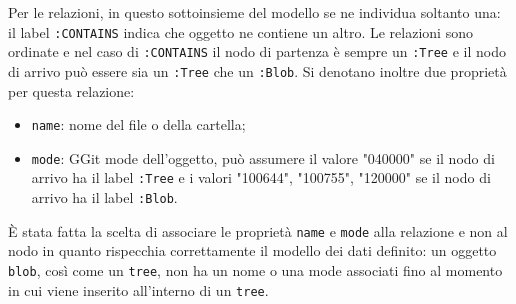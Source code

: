 Per le relazioni, in questo sottoinsieme del modello se ne individua soltanto una: il label \texttt{:CONTAINS} indica che oggetto ne contiene un altro. Le relazioni sono ordinate e nel caso di \texttt{:CONTAINS} il nodo di partenza è sempre un \texttt{:Tree} e il nodo di arrivo può essere sia un \texttt{:Tree} che un \texttt{:Blob}.
Si denotano inoltre due proprietà per questa relazione:
\begin{itemize}
    \item \texttt{name}: nome del file o della cartella;
    \item \texttt{mode}: GGit mode dell'oggetto, può assumere il valore "040000" se il nodo di arrivo ha il label \texttt{:Tree} e i valori {"100644", "100755", "120000"} se il nodo di arrivo ha il label \texttt{:Blob}.
\end{itemize}

È stata fatta la scelta di associare le proprietà \texttt{name} e \texttt{mode} alla relazione e non al nodo in quanto rispecchia correttamente il modello dei dati definito: un oggetto \texttt{blob}, così come un \texttt{tree}, non ha un nome o una mode associati fino al momento in cui viene inserito all'interno di un \texttt{tree}.

